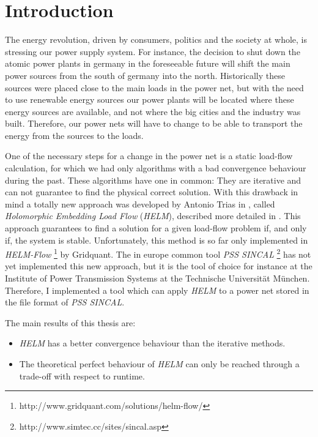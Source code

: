 \chapter{Introduction}
The energy revolution, driven by consumers, politics and the society at whole, is stressing our power supply system. For instance, the decision to shut down the atomic power plants in germany in the foreseeable future will shift the main power sources from the south of germany into the north. Historically these sources were placed close to the main loads in the power net, but with the need to use renewable energy sources our power plants will be located where these energy sources are available, and not where the big cities and the industry was built. Therefore, our power nets will have to change to be able to transport the energy from the sources to the loads.

One of the necessary steps for a change in the power net is a static load-flow calculation, for which we had only algorithms with a bad convergence behaviour during the past. These algorithms have one in common: They are iterative and can not guarantee to find the physical correct solution. With this drawback in mind a totally new approach was developed by Antonio Trias in \citep{helmIEEE}, called \emph{Holomorphic Embedding Load Flow} (\emph{HELM}), described more detailed in . This approach guarantees to find a solution for a given load-flow problem if, and only if, the system is stable. Unfortunately, this method is so far only implemented in \emph{HELM-Flow} \footnote{http://www.gridquant.com/solutions/helm-flow/} by Gridquant. The in europe common tool \emph{PSS SINCAL} \footnote{http://www.simtec.cc/sites/sincal.asp} has not yet implemented this new approach, but it is the tool of choice for instance at the Institute of Power Transmission Systems at the Technische Universität München. Therefore, I implemented a tool which can apply \emph{HELM} to a power net stored in the file format of \emph{PSS SINCAL}.

The main results of this thesis are:
\begin{itemize}
	\item \emph{HELM} has a better convergence behaviour than the iterative methods.
	\item The theoretical perfect behaviour of \emph{HELM} can only be reached through a trade-off with respect to runtime.
\end{itemize}